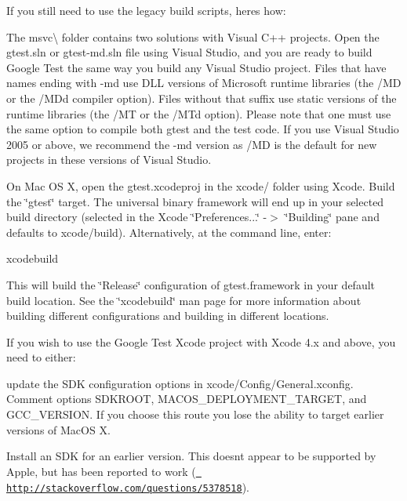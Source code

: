 If you still need to use the legacy build scripts, here\textquotesingle{}s how\+:

The msvc\textbackslash{} folder contains two solutions with Visual C++ projects. Open the {\ttfamily gtest.\+sln} or {\ttfamily gtest-\/md.\+sln} file using Visual Studio, and you are ready to build Google Test the same way you build any Visual Studio project. Files that have names ending with -\/md use D\+LL versions of Microsoft runtime libraries (the /\+MD or the /\+M\+Dd compiler option). Files without that suffix use static versions of the runtime libraries (the /\+MT or the /\+M\+Td option). Please note that one must use the same option to compile both gtest and the test code. If you use Visual Studio 2005 or above, we recommend the -\/md version as /\+MD is the default for new projects in these versions of Visual Studio.

On Mac OS X, open the {\ttfamily gtest.\+xcodeproj} in the {\ttfamily xcode/} folder using Xcode. Build the \char`\"{}gtest\char`\"{} target. The universal binary framework will end up in your selected build directory (selected in the Xcode \char`\"{}\+Preferences...\char`\"{} -\/$>$ \char`\"{}\+Building\char`\"{} pane and defaults to xcode/build). Alternatively, at the command line, enter\+: \begin{DoxyVerb}xcodebuild
\end{DoxyVerb}


This will build the \char`\"{}\+Release\char`\"{} configuration of gtest.\+framework in your default build location. See the \char`\"{}xcodebuild\char`\"{} man page for more information about building different configurations and building in different locations.

If you wish to use the Google Test Xcode project with Xcode 4.\+x and above, you need to either\+:


\begin{DoxyItemize}
\item update the S\+DK configuration options in xcode/\+Config/\+General.\+xconfig. Comment options {\ttfamily S\+D\+K\+R\+O\+OT}, {\ttfamily M\+A\+C\+O\+S\+\_\+\+D\+E\+P\+L\+O\+Y\+M\+E\+N\+T\+\_\+\+T\+A\+R\+G\+ET}, and {\ttfamily G\+C\+C\+\_\+\+V\+E\+R\+S\+I\+ON}. If you choose this route you lose the ability to target earlier versions of Mac\+OS X.
\item Install an S\+DK for an earlier version. This doesn\textquotesingle{}t appear to be supported by Apple, but has been reported to work (\href{http://stackoverflow.com/questions/5378518}{\texttt{ http\+://stackoverflow.\+com/questions/5378518}}).
\end{DoxyItemize}

